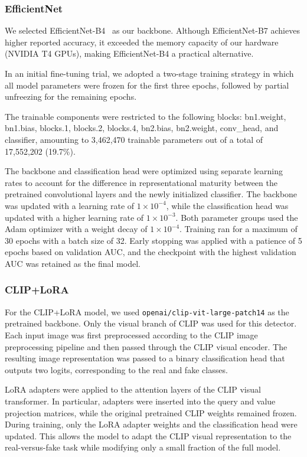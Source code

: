 \subsubsection{EfficientNet}
\label{subsubsec:efficientnet-ft}
We selected EfficientNet-B4~\cite{tan2019efficientnet} as our backbone. Although EfficientNet-B7 achieves higher reported accuracy, it exceeded the memory capacity of our hardware (NVIDIA T4 GPUs), making EfficientNet-B4 a practical alternative.

In an initial fine-tuning trial, we adopted a two-stage training strategy in which all model parameters were frozen for the first three epochs, followed by partial unfreezing for the remaining epochs.

The trainable components were restricted to the following blocks: bn1.weight, bn1.bias, blocks.1, blocks.2, blocks.4, bn2.bias, bn2.weight, conv\_head, and classifier, amounting to 3,462,470 trainable parameters out of a total of 17,552,202 (19.7\%).

The backbone and classification head were optimized using separate learning rates to account for the difference in representational maturity between the pretrained convolutional layers and the newly initialized classifier. The backbone was updated with a learning rate of $1 \times 10^{-4}$, while the classification head was updated with a higher learning rate of $1 \times 10^{-3}$. Both parameter groups used the Adam optimizer with a weight decay of $1 \times 10^{-4}$. Training ran for a maximum of 30 epochs with a batch size of 32. Early stopping was applied with a patience of 5 epochs based on validation AUC, and the checkpoint with the highest validation AUC was retained as the final model.

\subsubsection{CLIP+LoRA}
\label{subsubsec:clip-lora-ft}

For the CLIP+LoRA model, we used \texttt{openai/clip-vit-large-patch14} as the pretrained backbone. Only the visual branch of CLIP was used for this detector. Each input image was first preprocessed according to the CLIP image preprocessing pipeline and then passed through the CLIP visual encoder. The resulting image representation was passed to a binary classification head that outputs two logits, corresponding to the real and fake classes.

LoRA adapters were applied to the attention layers of the CLIP visual transformer. In particular, adapters were inserted into the query and value projection matrices, while the original pretrained CLIP weights remained frozen. During training, only the LoRA adapter weights and the classification head were updated. This allows the model to adapt the CLIP visual representation to the real-versus-fake task while modifying only a small fraction of the full model.

